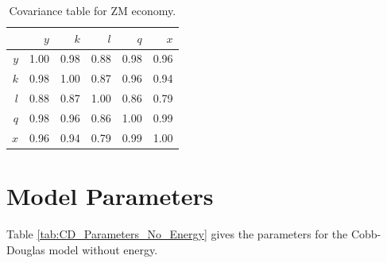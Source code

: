 \documentclass[preprint,authoryear,12pt]{elsarticle}\usepackage{graphicx, color}
\begin{document}
\begin{table}[H]
\begin{center}
\caption{Covariance table for  ZM economy.}
\label{tab:Covariance_ZM}
\begin{tabular}{rrrrrr}
  \hline
 & $y$ & $k$ & $l$ & $q$ & $x$ \\ 
  \hline
$y$ & 1.00 & 0.98 & 0.88 & 0.98 & 0.96 \\ 
  $k$ & 0.98 & 1.00 & 0.87 & 0.96 & 0.94 \\ 
  $l$ & 0.88 & 0.87 & 1.00 & 0.86 & 0.79 \\ 
  $q$ & 0.98 & 0.96 & 0.86 & 1.00 & 0.99 \\ 
  $x$ & 0.96 & 0.94 & 0.79 & 0.99 & 1.00 \\ 
   \hline
\end{tabular}
\end{center}
\end{table}



\section{Model Parameters}
\setcounter{table}{0} %

Table \ref{tab:CD_Parameters_No_Energy} gives the parameters for the Cobb-Douglas model without energy.
\end{document}
